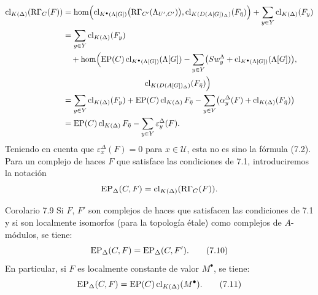 \[
\begin{aligned}
\clK{\Delta}(\RG_C(F))
&=\operatorname{hom}\Bigl(
\clKstar{\Lambda[G]}\bigl(\RG_{C'}(\Lambda_{U',C'})\bigr),
\cl_{K(D(A[G])_\Delta)}(F_{\bar\eta})\Bigr)
 +\sum_{y\in Y}\clK{\Delta}(F_y)\\
&=\sum_{y\in Y}\clK{\Delta}(F_y)\\
&\quad +\operatorname{hom}\Bigl(
\EP(C)\clKstar{\Lambda[G]}(\Lambda[G])
 -\sum_{y\in Y}\bigl(Sw_y^{\Lambda}+\clKstar{\Lambda[G]}(\Lambda[G])\bigr),\\
&\hspace{10em}\cl_{K(D(A[G])_\Delta)}(F_{\bar\eta})\Bigr)\\
&=\sum_{y\in Y}\clK{\Delta}(F_y)
 +\EP(C)\clK{\Delta}F_{\bar\eta}
 -\sum_{y\in Y}\bigl(\alpha_y^\Delta(F)+\clK{\Delta}(F_{\bar\eta})\bigr)\\
&=\EP(C)\clK{\Delta}F_{\bar\eta}
 -\sum_{y\in Y}\varepsilon_y^\Delta(F).
\end{aligned}
\]
Teniendo en cuenta que $\varepsilon_x^\Delta(F)=0$ para $x\in\mathcal U$, esta no es sino la fórmula (7.2). Para un complejo de haces $F$ que satisface las condiciones de 7.1, introduciremos la notación
\[
\operatorname{EP}_\Delta(C,F)=\operatorname{cl}_{K(\Delta)}(\mathrm R\Gamma_C(F)).
\]

\begin{statement}{Corolario 7.9}
Si $F$, $F'$ son complejos de haces que satisfacen las condiciones de 7.1 y si son localmente isomorfos (para la topología étale) como complejos de $A$-módulos, se tiene:
\[
\operatorname{EP}_\Delta(C,F)=\operatorname{EP}_\Delta(C,F').
\tag{7.10}
\]
En particular, si $F$ es localmente constante de valor $M^\bullet$, se tiene:
\[
\operatorname{EP}_\Delta(C,F)=\operatorname{EP}(C)\operatorname{cl}_{K(\Delta)}(M^\bullet).
\tag{7.11}
\]
\end{statement}
